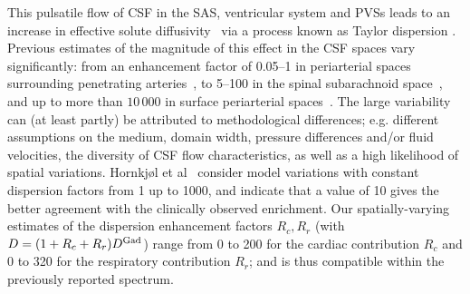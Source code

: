 \documentclass[fleqn,10pt]{wlscirep}
\begin{document}


This pulsatile flow of CSF in the SAS, ventricular system and PVSs
leads to an increase in effective solute
diffusivity~\cite{stockman2007effect, hettiarachchi2011effect,
  asgari2016glymphatic, sharp2019dispersion, ray2021quantitative} via
a process known as Taylor dispersion \cite{taylor1953dispersion,
  watson1983diffusion}. Previous estimates of the magnitude of this
effect in the CSF spaces vary significantly: from an enhancement
factor of 0.05--1 in periarterial spaces surrounding penetrating
arteries~\cite{asgari2016glymphatic, troyetsky2021dispersion}, to
5--100 in the spinal subarachnoid space~\cite{stockman2007effect,
  hettiarachchi2011effect, sharp2019dispersion}, and up to more than
$10\,000$ in surface periarterial spaces~\cite{ray2021quantitative,
  sharp2019dispersion}. The large variability can (at least partly) be
attributed to methodological differences; e.g. different assumptions
on the medium, domain width, pressure differences and/or fluid
velocities, the diversity of CSF flow characteristics, as well as a
high likelihood of spatial variations. Hornkjøl et
al~\cite{hornkjol2022csf} consider model variations with constant
dispersion factors from 1 up to 1000, and indicate that a value of 10
gives the better agreement with the clinically observed
enrichment. Our spatially-varying estimates of the dispersion
enhancement factors $R_c, R_r$ (with $D = (1 + R_c + R_r) D^{\rm
  Gad}$) range from 0 to 200 for the cardiac contribution $R_c$ and 0
to 320 for the respiratory contribution $R_r$; and is thus compatible
within the previously reported spectrum.
\end{document}
